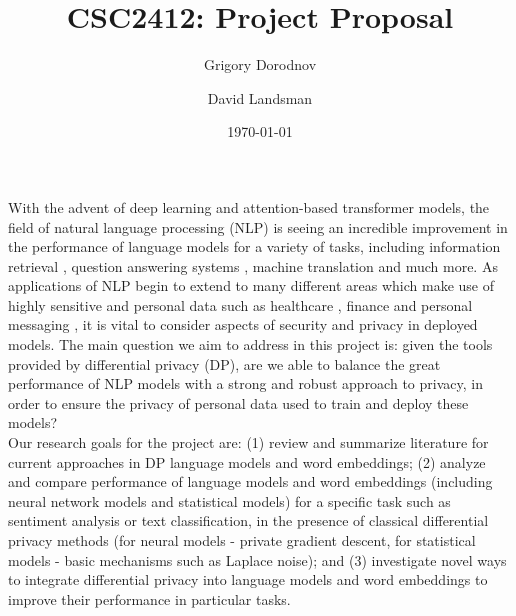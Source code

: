 \documentclass{article}
\title{CSC2412: Project Proposal}
\author{Grigory Dorodnov \and David Landsman}
\date{\today}
\begin{document}
\maketitle
With the advent of deep learning and attention-based transformer models, the field of natural
language processing (NLP) is seeing an incredible improvement in the performance of language models
for a variety of tasks, including information retrieval \cite{guo2016deep, macavaney2019cedr, zamani2018neural}, question answering systems \cite{dong2015question, santoro2017simple},
machine translation \cite{cho2014learning, sutskever2014sequence, wu2016google} and much more. As applications of NLP begin to extend to many different areas
which make use of highly sensitive and personal data
such as healthcare \cite{zheng2019use}, finance 
\cite{lewis2019fad_or_future} and personal messaging \cite{chee2009measuring}, 
it is vital to consider aspects of security and privacy in deployed models.
The main question we aim to address in this project is: 
given the tools provided by differential privacy (DP), 
are we able to balance the great performance of NLP models
with a strong and robust approach to privacy, in order to ensure the privacy of personal data
used to train and deploy these models?
\\

Our research goals for the project are: 
(1) review and summarize literature for current approaches in DP language models and word embeddings;
(2) analyze and compare performance of language models and word embeddings 
(including neural network models and statistical models)
for a specific task such as sentiment analysis or text classification,
in the presence of classical differential privacy methods 
(for neural models - private gradient descent, for statistical models - basic mechanisms such as Laplace noise); and
(3) investigate novel ways to integrate differential privacy into language models and word embeddings
to improve their performance in particular tasks.
\\
\end{document}
